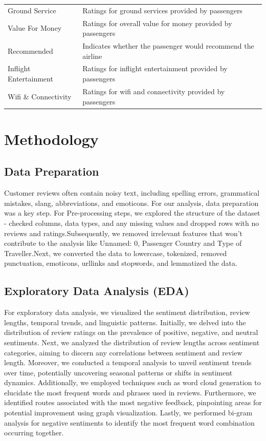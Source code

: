 \documentclass[11pt]{article} %
\begin{document}
\begin{table}[H]
\begin{tabular}{@{}ll@{}}
{\color[HTML]{343434} Ground   Service}         & Ratings for ground services   provided by passengers                     \\
{\color[HTML]{343434} Value   For Money}        & Ratings for overall value for   money provided by passengers             \\
{\color[HTML]{343434} Recommended}              & Indicates whether the passenger   would recommend the airline            \\
{\color[HTML]{343434} Inflight   Entertainment} & Ratings for inflight entertainment   provided by passengers              \\
{\color[HTML]{343434} Wifi   \& Connectivity}   & Ratings for wifi and connectivity   provided by passengers               \\ \bottomrule
\end{tabular}
\end{table}
\section{Methodology}
\subsection{Data Preparation}
Customer reviews often contain noisy text, including spelling errors, grammatical mistakes, slang, abbreviations, and emoticons. For our analysis, data preparation was a key step. For Pre-processing steps, we explored the structure of the dataset - checked columns, data types, and any missing values and dropped rows with no reviews and ratings.Subsequently, we removed irrelevant features that won't contribute to the analysis like Unnamed: 0, Passenger Country and Type of Traveller.Next, we converted the data to lowercase, tokenized, removed punctuation, emoticons, urllinks and stopwords, and lemmatized the data.

\subsection{Exploratory Data Analysis (EDA)}
For exploratory data analysis, we visualized the sentiment distribution, review lengths, temporal trends, and linguistic patterns. Initially, we delved into the distribution of review ratings on the prevalence of positive, negative, and neutral sentiments. Next, we analyzed the distribution of review lengths across sentiment categories, aiming to discern any correlations between sentiment and review length. Moreover, we conducted a temporal analysis to unveil sentiment trends over time, potentially uncovering seasonal patterns or shifts in sentiment dynamics. Additionally, we employed techniques such as word cloud generation to elucidate the most frequent words and phrases used in reviews. Furthermore, we identified routes associated with the most negative feedback, pinpointing areas for potential improvement using graph visualization. Lastly, we performed bi-gram analysis for negative sentiments to identify the most frequent word combination occurring together.
\end{document}

